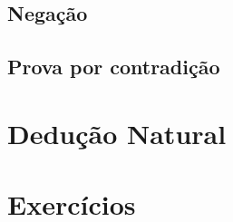 
\subsection{Negação}
\subsection{Prova por contradição}

\section{Dedução Natural}

\section{Exercícios}
